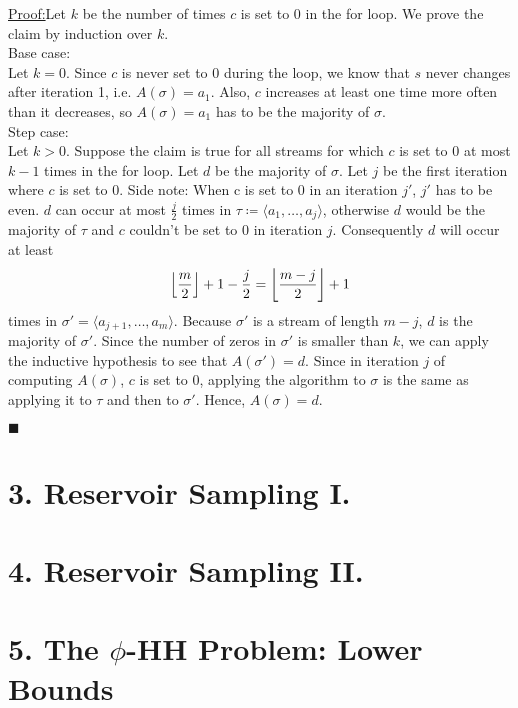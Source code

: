 \documentclass{article}
\DeclarePairedDelimiter\floor{\lfloor}{\rfloor}
\newenvironment{claimproof}[1]{\par\noindent\underline{Proof:}\space#1}{\hfill $\blacksquare$}
\begin{document}
\begin{claimproof}
Let $k$ be the number of times $c$ is set to 0 in the for loop. We prove the claim by induction over $k$. \\

Base case:\\
Let $k=0$. Since $c$ is never set to $0$ during the loop,
we know that $s$ never changes after iteration 1, i.e. $A(\sigma) = a_1$.
Also, $c$ increases at least one time more often than it decreases,
so $A(\sigma) = a_1$ has to be the majority of $\sigma$. \\

Step case:\\
Let $k>0$. Suppose the claim is true for all streams for which $c$ is set to 0 at most $k-1$ times in the for loop.
Let $d$ be the majority of $\sigma$. Let $j$ be the first iteration where $c$ is set to 0.
Side note: When c is set to 0 in an iteration $j'$, $j'$ has to be even.
$d$ can occur at most $\frac{j}{2}$ times in $\tau \coloneqq \langle a_1, \hdots, a_j \rangle$,
otherwise $d$ would be the majority of $\tau$ and $c$ couldn't be set to 0 in iteration $j$. Consequently $d$ will occur at least
\[
\floor*{\frac{m}{2}} + 1 - \frac{j}{2} = \floor*{\frac{m-j}{2}} + 1
\]
times in $\sigma' = \langle a_{j+1}, \hdots, a_m \rangle$.
Because $\sigma'$ is a stream of length $m-j$, $d$ is the majority of $\sigma'$.
Since the number of zeros in $\sigma'$ is smaller than $k$,
we can apply the inductive hypothesis to see that $A(\sigma') = d$.
    Since in iteration $j$ of computing $A(\sigma)$, $c$ is set to 0, applying the algorithm to $\sigma$ is the same as
applying it to $\tau$ and then to $\sigma'$. Hence, $A(\sigma) = d$.

\end{claimproof}


\section*{3. Reservoir Sampling I.}



\section*{4. Reservoir Sampling II.}



\section*{5. The $\phi$-HH Problem: Lower Bounds}
\end{document}
